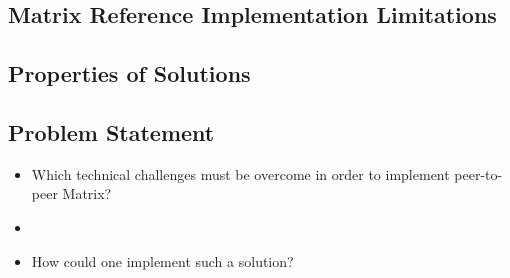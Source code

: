 \subsection{Matrix Reference Implementation Limitations}
\subsection{Properties of Solutions}

\subsection{Problem Statement}
\begin{itemize}
    \item Which technical challenges must be overcome in order to implement peer-to-peer Matrix?
    \item 
    \item How could one implement such a solution?
\end{itemize}
